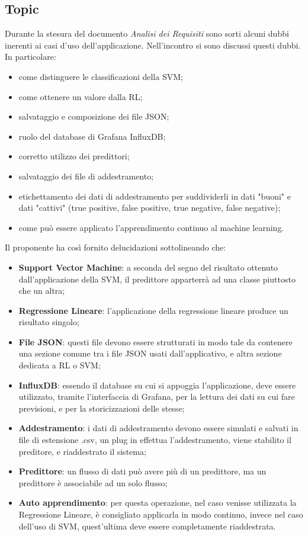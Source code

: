 \subsection{Topic}
Durante la stesura del documento \textit{Analisi dei Requisiti} sono sorti alcuni dubbi inerenti ai casi d'uso dell'applicazione. Nell'incontro si sono discussi questi dubbi.\\
In particolare:
\begin{itemize}
	\item come distinguere le classificazioni della SVM;
	\item come ottenere un valore dalla RL;
	\item salvataggio e composizione dei file JSON;
	\item ruolo del database di Grafana InfluxDB;
	\item corretto utilizzo dei predittori;
	\item salvataggio dei file di addestramento;
	\item etichettamento dei dati di addestramento per suddividerli in dati "buoni" e dati "cattivi" (true positive, false positive, true negative, false negative);
	\item come può essere applicato l'apprendimento continuo al machine learning.
\end{itemize}
Il proponente ha così fornito delucidazioni sottolineando che:
\begin{itemize}
\item \textbf{Support Vector Machine}: a seconda del segno del risultato ottenuto dall'applicazione della SVM, il predittore apparterrà ad una classe piuttosto che un altra;
\item \textbf{Regressione Lineare}: l'applicazione della regressione lineare produce un risultato singolo;
\item \textbf{File JSON}: questi file devono essere strutturati in modo tale da contenere una sezione comune tra i file JSON usati dall'applicativo, e altra sezione dedicata a RL o SVM;
\item \textbf{InfluxDB}: essendo il database su cui si appoggia l'applicazione, deve essere utilizzato, tramite l'interfaccia di Grafana, per la lettura dei dati su cui fare previsioni, e per la storicizzazioni delle stesse;
\item \textbf{Addestramento}: i dati di addestramento devono essere simulati e salvati in file di estensione .csv\glo , un plug in effettua l'addestramento, viene stabilito il preditore, e riaddestrato il sistema;
\item \textbf{Predittore}: un flusso di dati può avere più di un predittore, ma un predittore è associabile ad un solo flusso;
\item \textbf{Auto apprendimento}: per questa operazione, nel caso venisse utilizzata la Regressione Lineare, è consigliato applicarla in modo continuo, invece nel caso dell'uso di SVM, quest'ultima deve essere completamente riaddestrata.
\end{itemize}